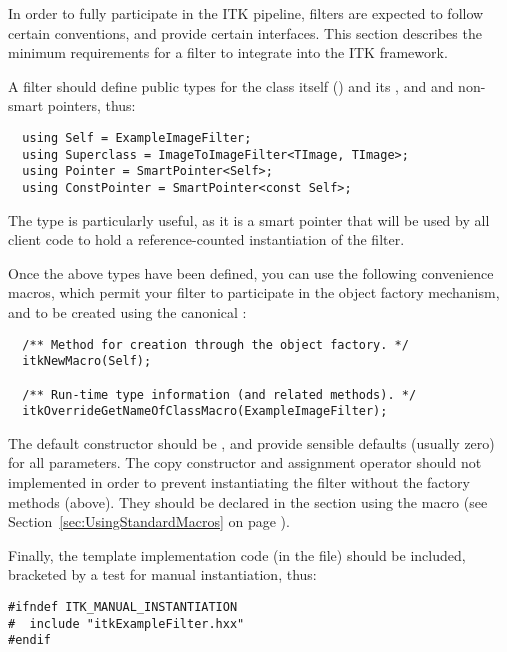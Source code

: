In order to fully participate in the ITK pipeline, filters are expected to
follow certain conventions, and provide certain interfaces.  This section
describes the minimum requirements for a filter to integrate into the ITK
framework.

A filter should define public types for the class itself () and
its , and  and non- smart pointers,
thus:

\begin{verbatim}
  using Self = ExampleImageFilter;
  using Superclass = ImageToImageFilter<TImage, TImage>;
  using Pointer = SmartPointer<Self>;
  using ConstPointer = SmartPointer<const Self>;
\end{verbatim}

The  type is particularly useful, as it is a smart pointer
that will be used by all client code to hold a reference-counted
instantiation of the filter.

Once the above types have been defined, you can use the following
convenience macros, which permit your filter to participate in the object
factory mechanism, and to be created using the canonical :

\begin{verbatim}
  /** Method for creation through the object factory. */
  itkNewMacro(Self);

  /** Run-time type information (and related methods). */
  itkOverrideGetNameOfClassMacro(ExampleImageFilter);
\end{verbatim}

The default constructor should be , and provide sensible
defaults (usually zero) for all parameters. The copy constructor and
assignment operator should not implemented in order to prevent instantiating
the filter without the factory methods (above). They should be declared in the
 section using the  macro
(see Section~\ref{sec:UsingStandardMacros} on page
\pageref{sec:UsingStandardMacros}).

Finally, the template implementation code (in the  file) should
be included, bracketed by a test for manual instantiation, thus:

\begin{verbatim}
#ifndef ITK_MANUAL_INSTANTIATION
#  include "itkExampleFilter.hxx"
#endif
\end{verbatim}

